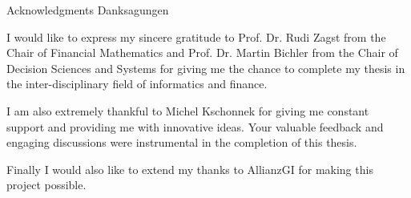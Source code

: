 \makeatletter
{}
{}
{}
\makeatother
\thispagestyle{empty}

\vspace*{20mm}

\begin{center}
\makeatletter
{}
{ Acknowledgments}
{ Danksagungen}
\makeatother
\end{center}

\vspace{10mm}

I would like to express my sincere gratitude to Prof. Dr. Rudi Zagst from the Chair of Financial Mathematics and Prof. Dr. Martin Bichler from the Chair of Decision Sciences and Systems for giving me the chance to complete my thesis in the inter-disciplinary field of informatics and finance.

I am also extremely thankful to Michel Kschonnek %
for giving me constant support and providing me with innovative ideas. Your valuable feedback and engaging discussions were instrumental in the completion of this thesis.

Finally I would also like to extend my thanks to AllianzGI for making this project possible.



\cleardoublepage{}
